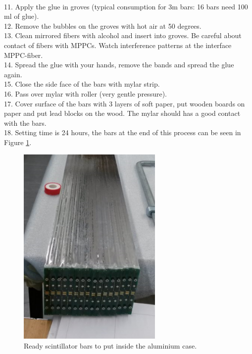 \documentclass[a4paper]{article}\linespread{1.4}
\begin{document}
\\11.	Apply the glue in groves (typical consumption for 3m bars: 16 bars need 100 ml of glue).
\\12.	Remove the bubbles on the groves with hot air at 50 degrees.
\\13.	Clean mirrored fibers with alcohol and insert into groves. Be careful about contact of fibers with MPPCs. Watch interference patterns at the interface MPPC-fiber.
\\14.	Spread the glue with your hands, remove the bands and spread the glue again.
\\15.	 Close the side face of the bars with mylar strip.
\\16.	 Pass over mylar with roller (very gentle pressure).
\\17.	Cover surface of the bars with 3 layers of soft paper, put wooden boards on paper and put lead blocks on the wood. The mylar should has a good contact with the bars.
\\18.	Setting time is 24 hours, the bars at the end of this process can be seen in Figure \ref{fig:ready}.
\begin{figure}[h!] \centering \includegraphics[width=70mm,scale=2.0]{figures/readypaint.png} \caption{Ready scintillator bars to put inside the aluminium case.}  \label{fig:ready}\end{figure}
\end{document}
